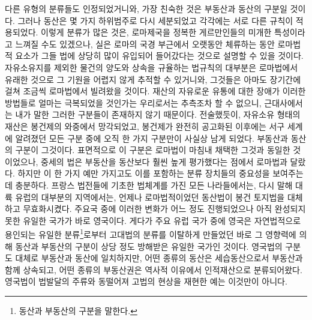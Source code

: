 다른 유형의 분류들도 인정되었거니와,
가장 친숙한 것은 부동산과 동산의 구분일 것이다.
그러나 동산은 몇 가지 하위범주로 다시 세분되었고
각각에는 서로 다른 규칙이 적용되었다.
이렇게 분류가 많은 것은,
로마제국을 정복한 게르만인들의 미개한 특성이라고 느껴질 수도 있겠으나,
실은
로마의 국경 부근에서 오랫동안 체류하는 동안
로마법적 요소가 그들 법에 상당히 많이 유입되어 들어갔다는 것으로
설명할 수 있을 것이다.
자유소유지를 제외한 물건의 양도와 상속을 규율하는 법규칙의 대부분은
로마법에서 유래한 것으로 그 기원을 어렵지 않게 추적할 수 있거니와,
그것들은 아마도 장기간에 걸쳐
조금씩 로마법에서 빌려왔을 것이다.
재산의 자유로운 유통에 대한 장애가
이러한 방법들로
얼마는 극복되었을 것인가는 우리로서는 추측조차 할 수 없으니,
근대사에서는 내가 말한 그러한 구분들이 존재하지 않기 때문이다.
전술했듯이,
자유소유 형태의 재산은 봉건제의 와중에서 망각되었고,
봉건제가 완전히 공고화된 이후에는
서구 세계에 알려졌던 모든 구분 중에 오직 한 가지 구분만이
사실상 남게 되었다.
부동산과 동산의 구분이 그것이다.
표면적으로 이 구분은 로마법이 마침내 채택한 그것과 동일한 것이었으나,
중세의 법은 부동산을 동산보다 훨씬 높게 평가했다는 점에서
로마법과 달랐다.
하지만 이 한 가지 예만 가지고도
이를 포함하는 분류 장치들의 중요성을 보여주는 데 충분하다.
프랑스 법전들에 기초한 법체계를 가진 모든 나라들에서는,
다시 말해 대륙 유럽의 대부분의 지역에서는,
언제나 로마법적이었던 동산법이 봉건 토지법을 대체하고 무효화시켰다.
주요국 중에
이러한 변화가 어느 정도 진행되었으나 아직 완성되지 못한
유일한 국가가 바로 영국이다.
게다가 주요 유럽 국가 중에 영국은
자연법적으로 용인되는 유일한
분류\footnote{%
  동산과 부동산의 구분을 말한다.
}로부터
고대법의 분류를 이탈하게 만들었던
바로 그 영향력에 의해
동산과 부동산의 구분이
상당 정도 방해받은
유일한 국가인 것이다.
영국법의 구분도 대체로 부동산과 동산에 일치하지만,
어떤 종류의 동산은 세습동산으로서 부동산과 함께 상속되고,
어떤 종류의 부동산권은 역사적 이유에서 인적재산으로 분류되어왔다.
영국법이
법발달의 주류와 동떨어져
고법의 현상을 재현한 예는 이것만이 아니다.

